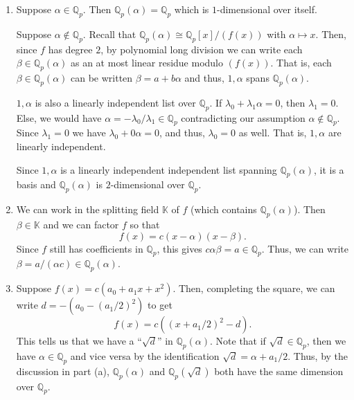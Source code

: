 \documentclass[12 pt, letterpaper]{hmcpset}
\begin{document}
\begin{solution}
	\begin{enumerate}
		\item Suppose $\alpha \in \mathbb{Q}_{p}$. Then $\mathbb{Q}_{p}(\alpha) = \mathbb{Q}_{p}$ which is $1$-dimensional over itself.

			Suppose $\alpha \notin \mathbb{Q}_p$. Recall that $\mathbb{Q}_{p}(\alpha) \cong \mathbb{Q}_{p}[x] / (f(x))$ with $\alpha \mapsto x$. Then, since $f$ has degree $2$, by polynomial long division we can write each $\beta \in \mathbb{Q}_{p}(\alpha)$ as an at most linear residue modulo $(f(x))$. That is, each $\beta \in \mathbb{Q}_{p}(\alpha)$ can be written $\beta = a + b \alpha$ and thus, $1, \alpha$ spans $\mathbb{Q}_{p}(\alpha)$.

			$1, \alpha$ is also a linearly independent list over $\mathbb{Q}_{p}$. If $\lambda_{0} + \lambda_{1} \alpha = 0$, then $\lambda_{1} = 0$. Else, we would have $\alpha = - \lambda_{0} / \lambda_{1} \in \mathbb{Q}_{p}$ contradicting our assumption $\alpha \notin \mathbb{Q}_{p}$. Since $\lambda_{1} = 0$ we have $\lambda_{0} + 0 \alpha = 0$, and thus, $\lambda_{0} = 0$ as well. That is, $1, \alpha$ are linearly independent. 

			Since $1, \alpha$ is a linearly independent independent list spanning $\mathbb{Q}_{p}(\alpha)$, it is a basis and $\mathbb{Q}_{p}(\alpha)$ is $2$-dimensional over $\mathbb{Q}_{p}$.

		\item We can work in the splitting field $\mathbb{K}$ of $f$ (which contains $\mathbb{Q}_{p}(\alpha)$). Then $\beta \in \mathbb{K}$ and we can factor $f$ so that
			\[
				f(x) = c (x - \alpha) (x - \beta).
			\]
			Since $f$ still has coefficients in $\mathbb{Q}_{p}$, this gives $c \alpha \beta = a \in \mathbb{Q}_{p}$. Thus, we can write $\beta = a / (\alpha c) \in \mathbb{Q}_{p}(\alpha)$.

		\item Suppose $f(x) = c(a_{0} + a_{1} x + x^{2})$. Then, completing the square, we can write $d = -(a_{0} - (a_{1} / 2)^{2})$ to get
			\[
				f(x) = c((x + a_{1} / 2)^{2} - d).
			\]
			This tells us that we have a  ``$\sqrt{d}$'' in $\mathbb{Q}_{p}(\alpha)$. Note that if $\sqrt{d} \in \mathbb{Q}_{p}$, then we have $\alpha \in \mathbb{Q}_{p}$ and vice versa by the identification $\sqrt{d} = \alpha + a_{1} / 2$. Thus, by the discussion in part (a), $\mathbb{Q}_{p}(\alpha)$ and $\mathbb{Q}_{p}(\sqrt{d})$ both have the same dimension over $\mathbb{Q}_{p}$.


\end{enumerate}
\end{solution}
\end{document}

